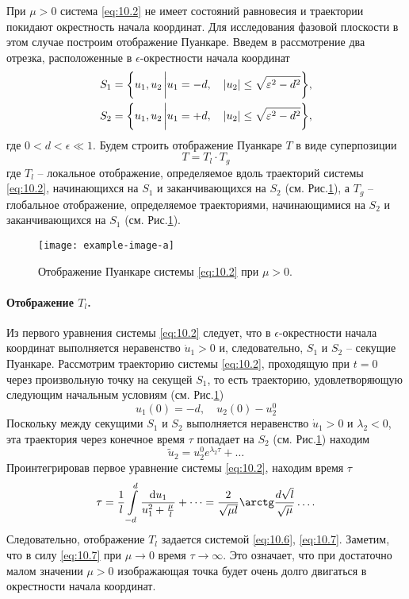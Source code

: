 При $\mu>0$ система \eqref{eq:10.2} не имеет состояний равновесия и траектории покидают окрестность начала
координат. Для исследования фазовой плоскости в этом случае построим отображение Пуанкаре. Введем
в рассмотрение два отрезка, расположенные в $\epsilon$-окрестности начала координат
\begin{align}
        S_1 &= \qty{u_1,u_2 \eval u_1 = -d, \quad \abs{u_2} \leq \sqrt{\epsilon^2-d^2} },\\
        S_2 &= \qty{u_1,u_2 \eval u_1= +d, \quad \abs{u_2} \leq \sqrt{\epsilon^2-d^2} },
\end{align}
где $0<d<\epsilon\ll 1.$ Будем строить отображение Пуанкаре $T$ в виде суперпозиции
\begin{equation}
        \label{eq:10.3}
        T = T_l \cdot  T_g 
\end{equation}
где $T_l$ -- локальное отображение, определяемое вдоль траекторий системы \eqref{eq:10.2}, начинающихся
на $S_1$  и заканчивающихся на $S_2$ (см. Рис.\ref{fig:10.2}), а $T_g$ -- глобальное отображение, определяемое 
траекториями, начинающимися на $S_2$ и заканчивающихся на $S_1$ (см. Рис.\ref{fig:10.2}).
\begin{figure}[h]
        \centering
        \texttt{[image: example-image-a]}
        \caption{Отображение Пуанкаре системы \eqref{eq:10.2} при $\mu>0$.}
        \label{fig:10.2}
\end{figure}

\paragraph{Отображение $T_l$.}%
Из первого уравнения системы \eqref{eq:10.2} следует, что в $\epsilon$-окрестности начала координат выполняется 
неравенство $\dot u_1 > 0$ и, следовательно, $S_1$ и $S_2$ -- секущие Пуанкаре. Рассмотрим 
траекторию системы \eqref{eq:10.2}, проходящую при $t=0$ через произвольную точку на секущей 
$S_1$, то есть траекторию, удовлетворяющую следующим начальным условиям (см. Рис.\ref{fig:10.2})
\begin{equation}
        \label{eq:10.4}
        u_1(0) = - d, \quad u_2(0) - u_2^0
\end{equation}
Поскольку между секущими $S_1$ и $S_2$ выполняется неравенство
$\dot u_1>0$ и $\lambda_2<0$, эта траектория через конечное время $\tau$ попадает на $S_2$ 
(см. Рис.\ref{fig:10.2}) находим
\begin{equation}
        \label{eq:10.6}
        \tilde u_2 = u_2^0 e^{\lambda_2 \tau} + \dots
\end{equation}
Проинтегрировав первое уравнение системы \eqref{eq:10.2}, находим время $\tau$ 
\begin{equation}
        \label{eq:10.7}
        \tau = \frac{1}{l} \int\limits_{-d}^{d} \frac{\dd{u_1}}{u_1^2 + \frac{\mu}{l}} + \dots
        = \frac{2}{\sqrt{\mu l}} \arctg \frac{d\sqrt l}{\sqrt \mu} \dots .
\end{equation}
Следовательно, отображение $T_l$ задается системой \eqref{eq:10.6}, \eqref{eq:10.7}.
Заметим, что в силу \eqref{eq:10.7} при $\mu \to 0$ время $\tau \to \infty$. Это означает, что при достаточно
малом значении $\mu>0$ изображающая точка будет очень долго двигаться в окрестности начала координат.

